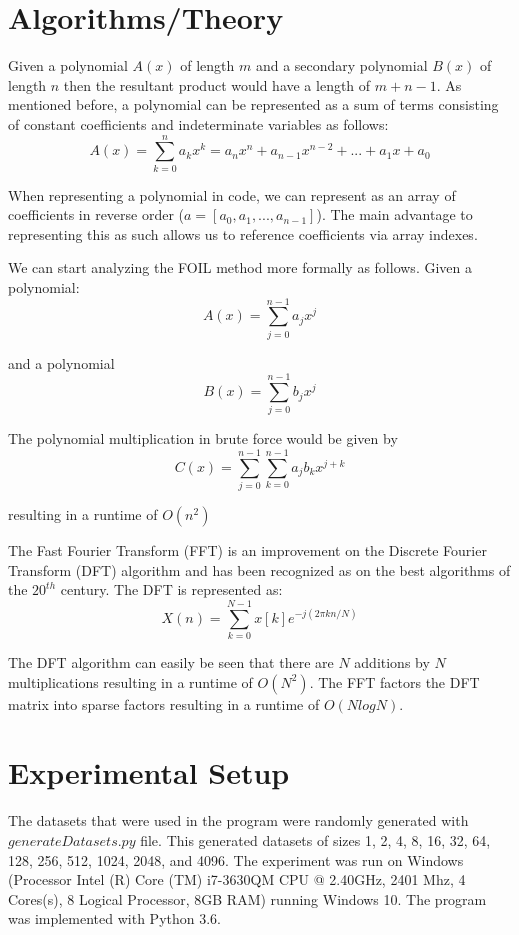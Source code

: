 \documentclass[12pt]{article}
\begin{document}
        \section{Algorithms/Theory}
        \indent\par{Given a polynomial $A(x)$ of length $m$ and a secondary polynomial $B(x)$ of length $n$ then the resultant product would have a length of $m+n-1$. As mentioned before, a polynomial can be represented as a sum of terms consisting of constant coefficients and indeterminate variables as follows: }
        $$A(x) = \sum_{k=0}^{n}a_kx^k = a_nx^n + a_{n-1}x^{n-2} + ... + a_1x + a_0$$
        \indent\par{When representing a polynomial in code, we can represent as an array of coefficients in reverse order ($a = [a_0,a_1,...,a_{n-1}]$). The main advantage to representing this as such allows us to reference coefficients via array indexes. }
        \indent\par{We can start analyzing the FOIL method more formally as follows. Given a polynomial:}
        $$ A(x)=\sum_{j=0}^{n-1}a_jx^j $$
        \par{and a polynomial}
        $$ B(x) =\sum_{j=0}^{n-1} b_jx^j $$
        \par{The polynomial multiplication in brute force would be given by }
        $$ C(x)=\sum_{j=0}^{n-1}\sum_{k=0}^{n-1}a_jb_kx^{j+k} $$
        \par{resulting in a runtime of $O(n^2)$}
        \indent\par{The Fast Fourier Transform (FFT) is an improvement on the Discrete Fourier Transform (DFT) algorithm and has been recognized as on the best algorithms of the $20^{th}$ century\cite{dongarra2000guest}. The DFT is represented as: }
        $$X(n)=\sum_{k=0}^{N-1}x[k]e^{-j(2\pi kn/N)}$$
        \indent\par{The DFT algorithm can easily be seen that there are $N$ additions by $N$ multiplications resulting in a runtime of $O(N^2)$. The FFT factors the DFT matrix into sparse factors resulting in a runtime of $O(N log N)$.}
        \section{Experimental Setup}
        \indent\par{The datasets that were used in the program were randomly generated with $generateDatasets.py$ file. This generated datasets of sizes 1, 2, 4, 8, 16, 32, 64, 128, 256, 512, 1024, 2048, and 4096. The experiment was run on Windows (Processor Intel (R) Core (TM) i7-3630QM CPU @ 2.40GHz, 2401 Mhz, 4 Cores(s), 8 Logical Processor, 8GB RAM) running Windows 10. The program was implemented with Python 3.6.}
\end{document}
